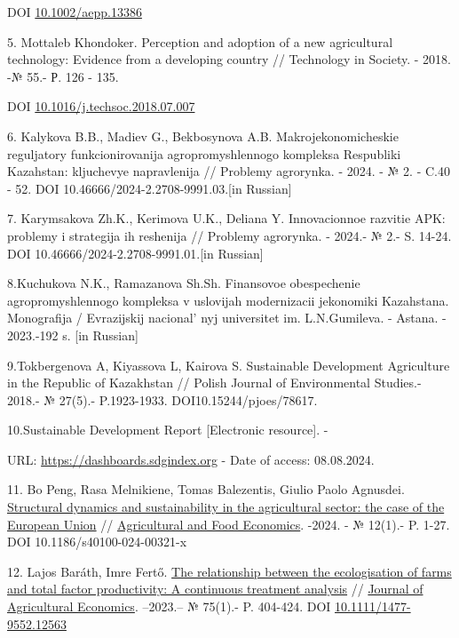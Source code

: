 {{DOI \href{https://doi.org/10.1002/aepp.13386}{10.1002/aepp.13386}

5. Mottaleb Khondoker. Perception and adoption of a new agricultural
technology: Evidence from a developing country // Technology in Society.
- 2018. -№ 55.- Р. 126 - 135.

DOI
\href{http://dx.doi.org/10.1016/j.techsoc.2018.07.007}{10.1016/j.techsoc.2018.07.007}

6. Kalykova B.B., Madiev G., Bekbosynova A.B. Makrojekonomicheskie
reguljatory funkcionirovanija agropromyshlennogo kompleksa Respubliki
Kazahstan: kljuchevye napravlenija // Problemy agrorynka. - 2024. - № 2.
- C.40 - 52. DOI 10.46666/2024-2.2708-9991.03.{[}in Russian{]}

7. Karymsakova Zh.K., Kerimova U.K., Deliana Y. Innovacionnoe razvitie
APK: problemy i strategija ih reshenija // Problemy agrorynka. - 2024.-
№ 2.- S. 14-24. DOI 10.46666/2024-2.2708-9991.01.{[}in Russian{]}

8.Kuchukova N.K., Ramazanova Sh.Sh. Finansovoe obespechenie
agropromyshlennogo kompleksa v uslovijah modernizacii jekonomiki
Kazahstana. Monografija / Evrazijskij nacional' nyj
universitet im. L.N.Gumileva. - Astana. - 2023.-192 s. {[}in Russian{]}

9.Tokbergenova A, Kiyassova L, Kairova S. Sustainable Development
Agriculture in the Republic of Kazakhstan // Polish Journal of
Environmental Studies.- 2018.- № 27(5).- P.1923-1933.
DOI10.15244/pjoes/78617.

10.Sustainable Development Report {[}Electronic resource{]}. -

URL: \url{https://dashboards.sdgindex.org} - Date of access: 08.08.2024.

11. Bo Peng, Rasa Melnikiene, Tomas Balezentis, Giulio Paolo Agnusdei.
\href{https://ideas.repec.org/a/spr/agfoec/v12y2024i1d10.1186_s40100-024-00321-x.html}{Structural
dynamics and sustainability in the agricultural sector: the case of the
European Union} //
\href{https://ideas.repec.org/s/spr/agfoec.html}{Agricultural and Food
Economics}. -2024. - № 12(1).- P. 1-27. DOI 10.1186/s40100-024-00321-x

12. Lajos Baráth, Imre Fertő.
\href{https://ideas.repec.org/a/bla/jageco/v75y2024i1p404-424.html}{The
relationship between the ecologisation of farms and total factor
productivity: A continuous treatment analysis} //
\href{https://ideas.repec.org/s/bla/jageco.html}{Journal of Agricultural
Economics}. --2023.-- № 75(1).- P. 404-424. DOI
\href{http://dx.doi.org/10.1111/1477-9552.12563}{10.1111/1477-9552.12563}

}}
